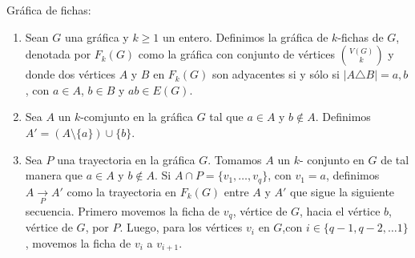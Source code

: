\begin{definicion} Gr\'afica de fichas:
    \label{def:fichas}
    \begin{enumerate}
        \item Sean $G$ una gr\'afica y $k \geq 1$ un entero. Definimos la
        gr\'afica de $k$-fichas de $G$, denotada por $F_k(G)$ como la
        gr\'afica con conjunto de v\'ertices $\binom{V(G)}{k}$ y donde dos
        v\'ertices $A$ y $B$ en $F_k(G)$ son adyacentes si y s\'olo si $|A
        \triangle B| ={a,b}$, con $a \in A$, $b \in B$ y $ab \in E(G)$.
        \item Sea $A$ un $k$-comjunto en la gr\'afica $G$ tal que $a \in A$
        y $b\notin A$. Definimos $A'= (A \setminus \{a\}) \cup \{b\}$.
        \item Sea $P$ una trayectoria en la gr\'afica $G$. Tomamos $A$ un
        $k$- conjunto en $G$ de tal manera que $a\in A$ y $b \notin A$. Si
        $A\cap P =\{v_1, \dots, v_q\}$, con $v_1 = a$, definimos $A
        \xrightarrow[P]{} A'$ como la trayectoria en $F_k(G)$ entre $A$ y
        $A'$ que sigue la siguiente secuencia. Primero movemos la ficha de
        $v_q$, v\'ertice de $G$, hacia el v\'ertice $b$, v\'ertice de $G$,
        por $P$. Luego, para los v\'ertices $v_i$ en $G$,con $i \in \{q-1,
        q-2, \dots 1\}$, movemos la ficha de $v_i$ a $v_{i+1}$. 
    \end{enumerate}
\end{definicion}
